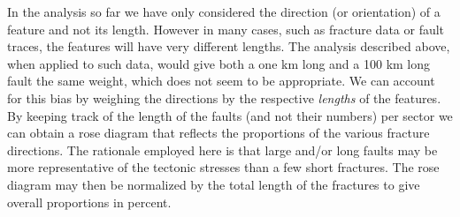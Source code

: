 	In the analysis so far we have only considered the direction (or orientation) of a feature and not its length.
However in many cases, such as fracture data or fault traces, the features will have very different lengths.  
The analysis described above, when applied to such data, would give both a one km long and a 100 km long fault
the same weight, which does not seem to be appropriate.  We 
can account for this bias by weighing the directions by the respective \emph{lengths} of the features.  By keeping 
track of the length of the faults (and not their numbers) per sector we can obtain a rose diagram that 
reflects the proportions of the various fracture directions.  The rationale employed here is that large and/or 
long faults may be more representative of the tectonic stresses than a few short fractures.  The 
rose diagram may then be normalized by the total length of the fractures to give overall proportions in 
percent.

